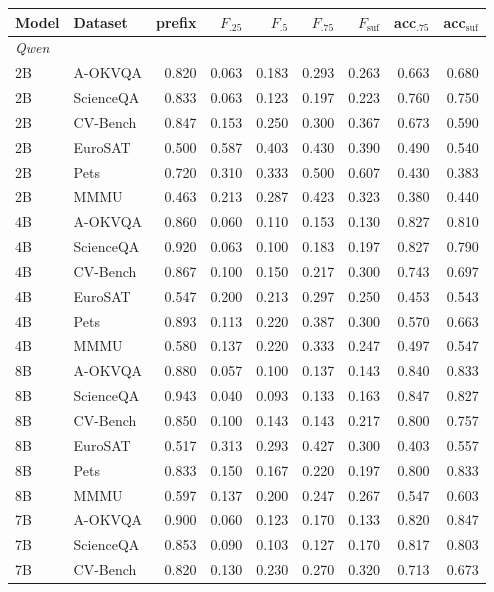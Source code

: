 \begin{tabular}{llrrrrrrr}
\toprule
Model & Dataset & prefix & $F_{.25}$ & $F_{.5}$ & $F_{.75}$ & $F_{\mathrm{suf}}$ & acc$_{.75}$ & acc$_{\mathrm{suf}}$ \\
\midrule
\multicolumn{9}{l}{\textit{Qwen}}\\
2B & A-OKVQA & 0.820 & 0.063 & 0.183 & 0.293 & 0.263 & 0.663 & 0.680 \\
2B & ScienceQA & 0.833 & 0.063 & 0.123 & 0.197 & 0.223 & 0.760 & 0.750 \\
2B & CV-Bench & 0.847 & 0.153 & 0.250 & 0.300 & 0.367 & 0.673 & 0.590 \\
2B & EuroSAT & 0.500 & 0.587 & 0.403 & 0.430 & 0.390 & 0.490 & 0.540 \\
2B & Pets & 0.720 & 0.310 & 0.333 & 0.500 & 0.607 & 0.430 & 0.383 \\
2B & MMMU & 0.463 & 0.213 & 0.287 & 0.423 & 0.323 & 0.380 & 0.440 \\
4B & A-OKVQA & 0.860 & 0.060 & 0.110 & 0.153 & 0.130 & 0.827 & 0.810 \\
4B & ScienceQA & 0.920 & 0.063 & 0.100 & 0.183 & 0.197 & 0.827 & 0.790 \\
4B & CV-Bench & 0.867 & 0.100 & 0.150 & 0.217 & 0.300 & 0.743 & 0.697 \\
4B & EuroSAT & 0.547 & 0.200 & 0.213 & 0.297 & 0.250 & 0.453 & 0.543 \\
4B & Pets & 0.893 & 0.113 & 0.220 & 0.387 & 0.300 & 0.570 & 0.663 \\
4B & MMMU & 0.580 & 0.137 & 0.220 & 0.333 & 0.247 & 0.497 & 0.547 \\
8B & A-OKVQA & 0.880 & 0.057 & 0.100 & 0.137 & 0.143 & 0.840 & 0.833 \\
8B & ScienceQA & 0.943 & 0.040 & 0.093 & 0.133 & 0.163 & 0.847 & 0.827 \\
8B & CV-Bench & 0.850 & 0.100 & 0.143 & 0.143 & 0.217 & 0.800 & 0.757 \\
8B & EuroSAT & 0.517 & 0.313 & 0.293 & 0.427 & 0.300 & 0.403 & 0.557 \\
8B & Pets & 0.833 & 0.150 & 0.167 & 0.220 & 0.197 & 0.800 & 0.833 \\
8B & MMMU & 0.597 & 0.137 & 0.200 & 0.247 & 0.267 & 0.547 & 0.603 \\
7B & A-OKVQA & 0.900 & 0.060 & 0.123 & 0.170 & 0.133 & 0.820 & 0.847 \\
7B & ScienceQA & 0.853 & 0.090 & 0.103 & 0.127 & 0.170 & 0.817 & 0.803 \\
7B & CV-Bench & 0.820 & 0.130 & 0.230 & 0.270 & 0.320 & 0.713 & 0.673 \\

\end{tabular}

